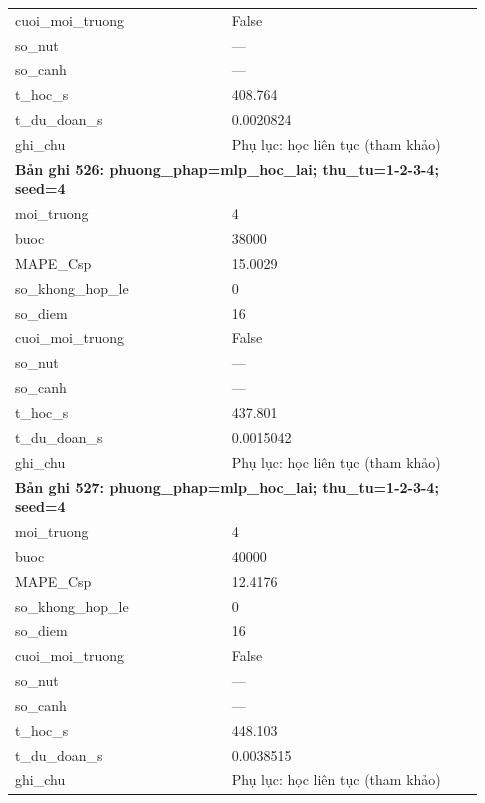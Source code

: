 \begin{longtable}{p{0.43\linewidth}p{0.50\linewidth}}
cuoi\_\allowbreak moi\_\allowbreak truong & False \\
so\_\allowbreak nut & — \\
so\_\allowbreak canh & — \\
t\_\allowbreak hoc\_\allowbreak s & 408.764 \\
t\_\allowbreak du\_\allowbreak doan\_\allowbreak s & 0.0020824 \\
ghi\_\allowbreak chu & Phụ lục: học liên tục (tham khảo) \\
\midrule
\multicolumn{2}{p{0.95\linewidth}}{\textbf{Bản ghi 526: phuong\_phap=mlp\_hoc\_lai; thu\_tu=1-2-3-4; seed=4}} \\
moi\_\allowbreak truong & 4 \\
buoc & 38000 \\
MAPE\_\allowbreak Csp & 15.0029 \\
so\_\allowbreak khong\_\allowbreak hop\_\allowbreak le & 0 \\
so\_\allowbreak diem & 16 \\
cuoi\_\allowbreak moi\_\allowbreak truong & False \\
so\_\allowbreak nut & — \\
so\_\allowbreak canh & — \\
t\_\allowbreak hoc\_\allowbreak s & 437.801 \\
t\_\allowbreak du\_\allowbreak doan\_\allowbreak s & 0.0015042 \\
ghi\_\allowbreak chu & Phụ lục: học liên tục (tham khảo) \\
\midrule
\multicolumn{2}{p{0.95\linewidth}}{\textbf{Bản ghi 527: phuong\_phap=mlp\_hoc\_lai; thu\_tu=1-2-3-4; seed=4}} \\
moi\_\allowbreak truong & 4 \\
buoc & 40000 \\
MAPE\_\allowbreak Csp & 12.4176 \\
so\_\allowbreak khong\_\allowbreak hop\_\allowbreak le & 0 \\
so\_\allowbreak diem & 16 \\
cuoi\_\allowbreak moi\_\allowbreak truong & False \\
so\_\allowbreak nut & — \\
so\_\allowbreak canh & — \\
t\_\allowbreak hoc\_\allowbreak s & 448.103 \\
t\_\allowbreak du\_\allowbreak doan\_\allowbreak s & 0.0038515 \\
ghi\_\allowbreak chu & Phụ lục: học liên tục (tham khảo) \\

\end{longtable}
